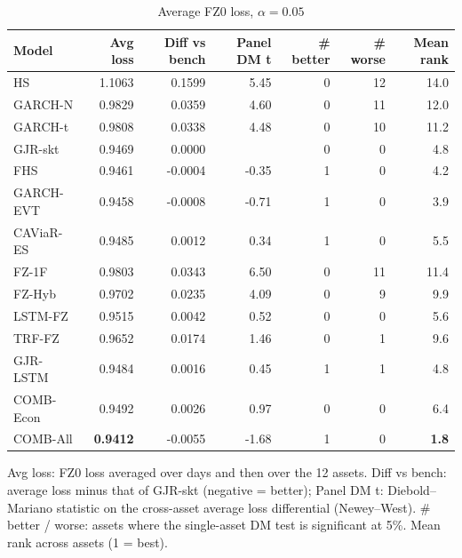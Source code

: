 \begin{table}[htbp]
\centering
\footnotesize
\caption{Average FZ0 loss, $\alpha=0.05$}
\label{tab:loss_a050}
\begin{tabular}{lrrrrrr}
\toprule
Model & Avg loss & Diff vs bench & Panel DM t & \# better & \# worse & Mean rank \\
\midrule
HS & 1.1063 & 0.1599 & 5.45 & 0 & 12 & 14.0 \\
GARCH-N & 0.9829 & 0.0359 & 4.60 & 0 & 11 & 12.0 \\
GARCH-t & 0.9808 & 0.0338 & 4.48 & 0 & 10 & 11.2 \\
GJR-skt & 0.9469 & 0.0000 &  & 0 & 0 & 4.8 \\
FHS & 0.9461 & -0.0004 & -0.35 & 1 & 0 & 4.2 \\
GARCH-EVT & 0.9458 & -0.0008 & -0.71 & 1 & 0 & 3.9 \\
CAViaR-ES & 0.9485 & 0.0012 & 0.34 & 1 & 0 & 5.5 \\
FZ-1F & 0.9803 & 0.0343 & 6.50 & 0 & 11 & 11.4 \\
FZ-Hyb & 0.9702 & 0.0235 & 4.09 & 0 & 9 & 9.9 \\
LSTM-FZ & 0.9515 & 0.0042 & 0.52 & 0 & 0 & 5.6 \\
TRF-FZ & 0.9652 & 0.0174 & 1.46 & 0 & 1 & 9.6 \\
GJR-LSTM & 0.9484 & 0.0016 & 0.45 & 1 & 1 & 4.8 \\
COMB-Econ & 0.9492 & 0.0026 & 0.97 & 0 & 0 & 6.4 \\
COMB-All & \textbf{0.9412} & -0.0055 & -1.68 & 1 & 0 & \textbf{1.8} \\
\bottomrule
\end{tabular}
\par\smallskip\parbox{\linewidth}{\scriptsize Avg loss: FZ0 loss averaged over days and then over the 12 assets. Diff vs bench: average loss minus that of GJR-skt (negative = better); Panel DM t: Diebold--Mariano statistic on the cross-asset average loss differential (Newey--West). \# better / worse: assets where the single-asset DM test is significant at 5\%. Mean rank across assets (1 = best).}
\end{table}